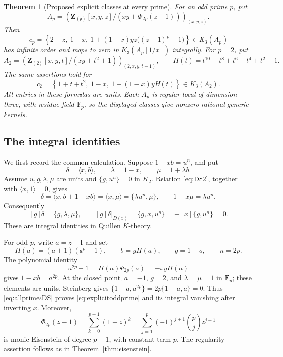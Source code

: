 \documentclass[11pt,a4paper]{article}
\newtheorem{theorem}{Theorem}[section]
\theoremstyle{remark}
\newcommand{\Z}{\mathbf Z}
\newcommand{\F}{\mathbf F}
\begin{document}
\begin{theorem}[Proposed explicit classes at every prime]\label{thm:explicitallprimes}
For an odd prime $p$, put
\[
 A_p=\left(\Z_{(p)}[x,y,z]/(xy+\Phi_{2p}(z-1))\right)_{(x,y,z)}.
\]
Then
\begin{equation}\label{eq:explicitoddprime}
 c_p=\left\{2-z,\ 1-x,\
 1+(1-x)yz\bigl((z-1)^p-1\bigr)\right\}\in K_3(A_p)
\end{equation}
has infinite order and maps to zero in $K_3(A_p[1/x])$ integrally.
For $p=2$, put
\[
 A_2=\left(\Z_{(2)}[x,y,t]/(xy+t^2+1)\right)_{(2,x,y,t-1)},
 \qquad H(t)=t^{10}-t^8+t^6-t^4+t^2-1.
\]
The same assertions hold for
\begin{equation}\label{eq:explicittwoprime}
 c_2=\left\{1+t+t^2,\ 1-x,\ 1+(1-x)yH(t)\right\}\in K_3(A_2).
\end{equation}
All entries in these formulas are units. Each $A_p$ is regular local of dimension three, with residue field $\F_p$, so the displayed classes give nonzero rational generic kernels.
\end{theorem}

\subsection{The integral identities}

We first record the common calculation. Suppose $1-xb=u^n$, and put
\[
 \delta=\langle x,b\rangle,\qquad \lambda=1-x,\qquad
 \mu=1+\lambda b.
\]
Assume $u,g,\lambda,\mu$ are units and $\{g,u^n\}=0$ in $K_2$.
Relation \eqref{eq:DS2}, together with $\langle x,1\rangle=0$, gives
\[
 \delta=\langle x,b+1-xb\rangle=\langle x,\mu\rangle
       =\{\lambda u^n,\mu\},
 \qquad 1-x\mu=\lambda u^n.
\]
Consequently
\begin{equation}\label{eq:allprimesDS}
 [g]\delta=\{g,\lambda,\mu\},\qquad
 [g]\delta|_{D(x)}=\{g,x,u^n\}=-[x]\{g,u^n\}=0.
\end{equation}
These are integral identities in Quillen $K$-theory.

For odd $p$, write $a=z-1$ and set
\[
 H(a)=(a+1)(a^p-1),\qquad b=yH(a),\qquad g=1-a,\qquad n=2p.
\]
The polynomial identity
\[
 a^{2p}-1=H(a)\Phi_{2p}(a)=-xyH(a)
\]
gives $1-xb=a^{2p}$. At the closed point,
$a=-1$, $g=2$, and $\lambda=\mu=1$ in $\F_p$; these elements are units.
Steinberg gives $\{1-a,a^{2p}\}=2p\{1-a,a\}=0$.
Thus \eqref{eq:allprimesDS} proves \eqref{eq:explicitoddprime} and its integral vanishing after inverting $x$.
Moreover,
\[
 \Phi_{2p}(z-1)
 =\sum_{k=0}^{p-1}(1-z)^k
 =\sum_{j=1}^{p}(-1)^{j+1}\binom pj z^{j-1}
\]
is monic Eisenstein of degree $p-1$, with constant term $p$. The regularity assertion follows as in Theorem~\ref{thm:eisenstein}.
\end{document}
